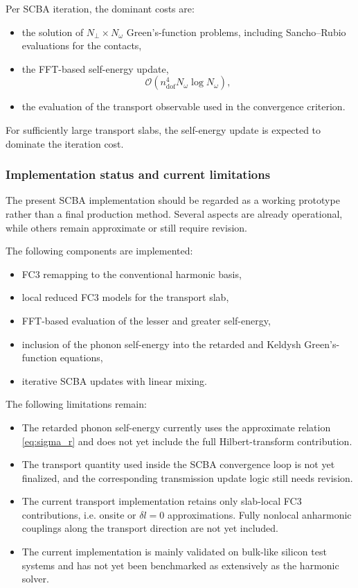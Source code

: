 Per SCBA iteration, the dominant costs are:
\begin{itemize}
  \item the solution of $N_\perp\times N_\omega$ Green's-function
        problems, including Sancho--Rubio evaluations for the contacts,
  \item the FFT-based self-energy update,
        \begin{equation}
          \mathcal{O}(n_\mathrm{dof}^4 N_\omega\log N_\omega),
        \end{equation}
  \item the evaluation of the transport observable used in the
        convergence criterion.
\end{itemize}
For sufficiently large transport slabs, the self-energy update is
expected to dominate the iteration cost.

\subsubsection{Implementation status and current limitations}

The present SCBA implementation should be regarded as a working
prototype rather than a final production method.  Several aspects are
already operational, while others remain approximate or still require
revision.

The following components are implemented:
\begin{itemize}
  \item FC3 remapping to the conventional harmonic basis,
  \item local reduced FC3 models for the transport slab,
  \item FFT-based evaluation of the lesser and greater self-energy,
  \item inclusion of the phonon self-energy into the retarded and
        Keldysh Green's-function equations,
  \item iterative SCBA updates with linear mixing.
\end{itemize}

The following limitations remain:
\begin{itemize}
  \item The retarded phonon self-energy currently uses the approximate
        relation \cref{eq:sigma_r} and does not yet include the full
        Hilbert-transform contribution.
  \item The transport quantity used inside the SCBA convergence loop is
        not yet finalized, and the corresponding transmission update
        logic still needs revision.
  \item The current transport implementation retains only slab-local FC3
        contributions, i.e. onsite or $\delta l=0$ approximations.
        Fully nonlocal anharmonic couplings along the transport
        direction are not yet included.
  \item The current implementation is mainly validated on bulk-like
        silicon test systems and has not yet been benchmarked as
        extensively as the harmonic solver.
\end{itemize}

